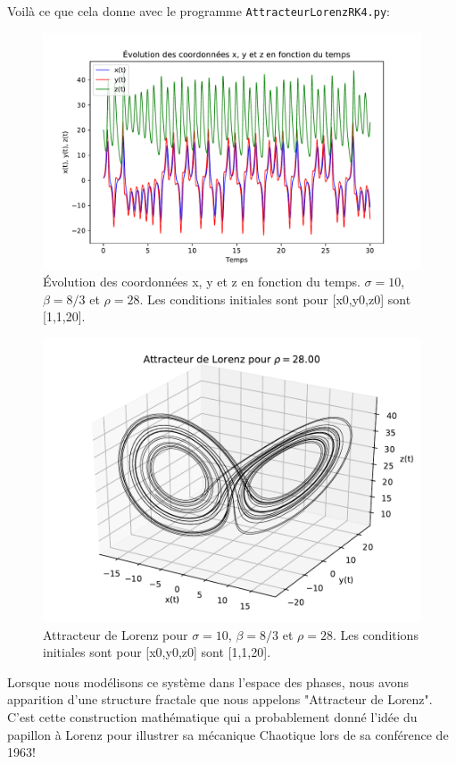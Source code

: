 \documentclass[%
oneside,                 %
final,                   %
10pt]{article}
\begin{document}
\noindent

 Voilà ce que cela donne avec le programme \texttt{AttracteurLorenzRK4.py}:


\begin{figure}[!ht]  %
  \centerline{\includegraphics[width=0.6\linewidth]{scripts/lorenz_ode_components.pdf}}
  \caption{
  Évolution des coordonnées x, y et z en fonction du temps. $\sigma = 10$, $\beta= 8/3$ et $\rho = 28$. Les conditions initiales sont pour [x0,y0,z0] sont [1,1,20].
  }
\end{figure}



\begin{figure}[!ht]  %
  \centerline{\includegraphics[width=0.7\linewidth]{scripts/lorenz_ode_3d.pdf}}
  \caption{
  Attracteur de Lorenz pour $\sigma = 10$, $\beta= 8/3$ et $\rho = 28$. Les conditions initiales sont pour [x0,y0,z0] sont [1,1,20].
  }
\end{figure}


Lorsque nous modélisons ce système dans l'espace des phases, nous avons apparition d'une structure fractale que nous appelons "Attracteur de Lorenz". C'est cette construction mathématique qui a probablement donné l'idée du papillon à Lorenz pour illustrer sa mécanique Chaotique lors de sa conférence de 1963!
\end{document}
